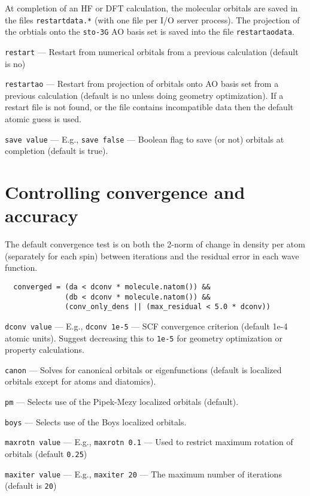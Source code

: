 \documentclass[letterpaper]{book}
\begin{document}
At completion of an HF or DFT calculation, the molecular orbitals are
saved in the files \verb+restartdata.*+ (with one file per I/O server
process).  The projection of the orbtials onto the {\tt sto-3G} AO basis
set is saved into the file {\tt restartaodata}.

{\tt restart} --- Restart from numerical orbitals from a previous calculation (default is no)

{\tt restartao} --- Restart from projection of orbitals onto AO basis
set from a previous calculation (default is no unless doing geometry
optimization).  If a restart file is not found, or the file contains
incompatible data then the default atomic guess is used.

{\tt save value} --- E.g., {\tt save false} --- Boolean flag to save (or not) orbitals at completion (default is true).

\section{Controlling convergence and accuracy}

The default convergence test is on both the 2-norm of change in density per atom (separately for each spin) between iterations and the residual error in each wave function.

\begin{verbatim}
  converged = (da < dconv * molecule.natom()) && 
              (db < dconv * molecule.natom()) &&
              (conv_only_dens || (max_residual < 5.0 * dconv))
\end{verbatim}

{\tt dconv value} --- E.g., {\tt dconv 1e-5} --- SCF convergence criterion (default 1e-4 atomic units).  Suggest decreasing this to {\tt 1e-5} for geometry optimization or property calculations.

{\tt canon} --- Solves for canonical orbitals or eigenfunctions (default is localized orbitals except for atoms and diatomics).

{\tt pm} --- Selects use of the Pipek-Mezy localized orbitals (default).

{\tt boys} --- Selects use of the Boys localized orbitals.

{\tt maxrotn value} --- E.g., {\tt maxrotn 0.1} --- Used to restrict maximum rotation of orbitals (default {\tt 0.25})

{\tt maxiter value} --- E.g., {\tt maxiter 20} --- The maximum number of iterations (default is {\tt 20})
\end{document}
